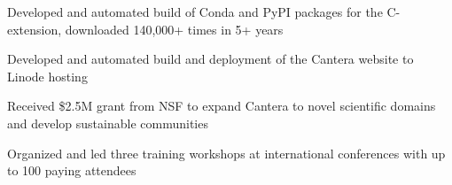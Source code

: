 \begin{tightemize}
\item Developed and automated build of Conda and PyPI packages for the C-extension, downloaded 140,000+ times in 5+ years
\item Developed and automated build and deployment of the Cantera website to Linode hosting
\item Received \$2.5M grant from NSF to expand Cantera to novel scientific domains and develop sustainable communities
\item Organized and led three training workshops at international conferences with up to 100 paying attendees
\end{tightemize}
\sectionsep

\\
\\

